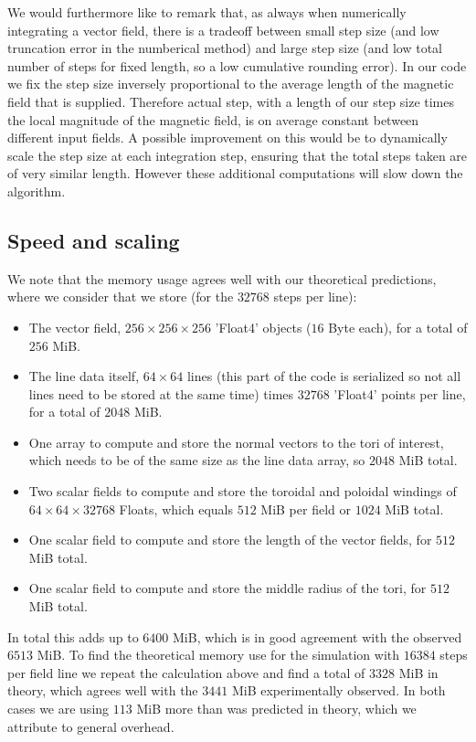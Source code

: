 \documentclass{article}
\begin{document}
We would furthermore like to remark that, as always when numerically integrating a vector field, there is a tradeoff between small step size (and low truncation error in the numberical method) and large step size (and low total number of steps for fixed length, so a low cumulative rounding error). In our code we fix the step size inversely proportional to the average length of the magnetic field that is supplied. Therefore actual step, with a length of our step size times the local magnitude of the magnetic field, is on average constant between different input fields. A possible improvement on this would be to dynamically scale the step size at each integration step, ensuring that the total steps taken are of very similar length. However these additional computations will slow down the algorithm.\\

\subsection{Speed and scaling}
We note that the memory usage agrees well with our theoretical predictions, where we consider that we store (for the $32768$ steps per line):
\begin{itemize}
\item The vector field, $256\times256\times256$ 'Float4' objects ($16$ Byte each), for a total of $256$ MiB.
\item The line data itself, $64\times 64$ lines (this part of the code is serialized so not all lines need to be stored at the same time) times $32768$ 'Float4' points per line, for a total of $2048$ MiB.
\item One array to compute and store the normal vectors to the tori of interest, which needs to be of the same size as the line data array, so $2048$ MiB total.
\item Two scalar fields to compute and store the toroidal and poloidal windings of $64\times 64\times 32768$ Floats, which equals $512$ MiB per field or $1024$ MiB total.
\item One scalar field to compute and store the length of the vector fields, for $512$ MiB total.
\item One scalar field to compute and store the middle radius of the tori, for $512$ MiB total.
\end{itemize}
In total this adds up to $6400$ MiB, which is in good agreement with the observed $6513$ MiB. To find the theoretical memory use for the simulation with $16384$ steps per field line we repeat the calculation above and find a total of $3328$ MiB in theory, which agrees well with the $3441$ MiB experimentally observed. In both cases we are using $113$ MiB more than was predicted in theory, which we attribute to general overhead.\\
\end{document}
